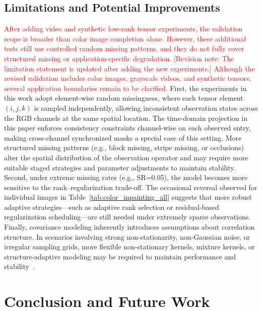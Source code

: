 \documentclass[a4paper,12pt]{article}
\numberwithin{equation}{section}
\numberwithin{algorithm}{section}
\newcommand{\rev}[1]{\textcolor{red}{#1}}
\newcommand{\revnote}[1]{\textcolor{red}{[Revision note: #1]}}
\theoremstyle{remark}
\theoremstyle{definition}
\begin{document}
\subsection{Limitations and Potential Improvements}  
\rev{After adding video and synthetic low-rank tensor experiments, the validation scope is broader than color image completion alone. However, these additional tests still use controlled random missing patterns, and they do not fully cover structured missing or application-specific degradation.} \revnote{The limitation statement is updated after adding the new experiments.}
\rev{Although the revised validation includes color images, grayscale videos, and synthetic tensors, several application boundaries remain to be clarified.} First, the experiments in this work adopt element-wise random missingness, where each tensor element \((i,j,k)\) is sampled independently, allowing inconsistent observation states across the RGB channels at the same spatial location. The time-domain projection in this paper enforces consistency constraints channel-wise on each observed entry, making cross-channel synchronized masks a special case of this setting. More structured missing patterns (e.g., block missing, stripe missing, or occlusions) alter the spatial distribution of the observation operator and may require more suitable staged strategies and parameter adjustments to maintain stability. Second, under extreme missing rates (e.g., SR=0.05), the model becomes more sensitive to the rank–regularization trade-off. The occasional reversal observed for individual images in Table~\ref{tab:color_inpainting_all} suggests that more robust adaptive strategies—such as adaptive rank selection or residual-based regularization scheduling—are still needed under extremely sparse observations. Finally, covariance modeling inherently introduces assumptions about correlation structure. In scenarios involving strong non-stationarity, non-Gaussian noise, or irregular sampling grids, more flexible non-stationary kernels, mixture kernels, or structure-adaptive modeling may be required to maintain performance and stability~\cite{rasmussen2006gpml}.


\section{Conclusion and Future Work}
\end{document}
